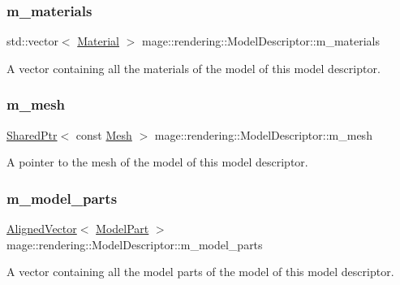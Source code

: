 \subsubsection{\texorpdfstring{m\+\_\+materials}{m\_materials}}
{\footnotesize\ttfamily std\+::vector$<$ \mbox{\hyperlink{classmage_1_1rendering_1_1_material}{Material}} $>$ mage\+::rendering\+::\+Model\+Descriptor\+::m\+\_\+materials\hspace{0.3cm}{\ttfamily [private]}}

A vector containing all the materials of the model of this model descriptor. \mbox{\label{classmage_1_1rendering_1_1_model_descriptor_a18fd5970f038726fd200e60f3c5ad33e}} 
\subsubsection{\texorpdfstring{m\+\_\+mesh}{m\_mesh}}
{\footnotesize\ttfamily \mbox{\hyperlink{namespacemage_a1e01ae66713838a7a67d30e44c67703e}{Shared\+Ptr}}$<$ const \mbox{\hyperlink{classmage_1_1rendering_1_1_mesh}{Mesh}} $>$ mage\+::rendering\+::\+Model\+Descriptor\+::m\+\_\+mesh\hspace{0.3cm}{\ttfamily [private]}}

A pointer to the mesh of the model of this model descriptor. \mbox{\label{classmage_1_1rendering_1_1_model_descriptor_a2c2eda62e6f2c7f6274a0f829b6abfa1}} 
\subsubsection{\texorpdfstring{m\+\_\+model\+\_\+parts}{m\_model\_parts}}
{\footnotesize\ttfamily \mbox{\hyperlink{namespacemage_a8664bfb5ce2179fc64eae9f82c8a5ba8}{Aligned\+Vector}}$<$ \mbox{\hyperlink{structmage_1_1rendering_1_1_model_part}{Model\+Part}} $>$ mage\+::rendering\+::\+Model\+Descriptor\+::m\+\_\+model\+\_\+parts\hspace{0.3cm}{\ttfamily [private]}}

A vector containing all the model parts of the model of this model descriptor. 